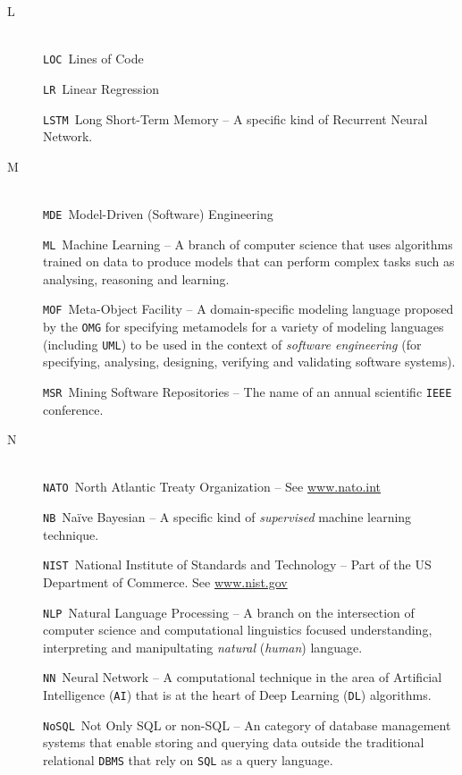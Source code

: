\begin{description}
\item[L]~\\
\verb|LOC|\quad~Lines of Code

\verb|LR|\quad~Linear Regression

\verb|LSTM|\quad~Long Short-Term Memory -- A specific kind of Recurrent Neural Network. %


\item[M]~\\

\verb|MDE|\quad~Model-Driven (Software) Engineering

\verb|ML|\quad~Machine Learning -- A branch of computer science that uses algorithms trained on data to produce models that can perform complex tasks such as analysing, reasoning and learning.

\verb|MOF|\quad~Meta-Object Facility -- A domain-specific modeling language proposed by the \verb|OMG| for specifying metamodels for a variety of modeling languages (including \verb|UML|) to be used in the context of \emph{software engineering} (\ie for specifying, analysing, designing, verifying and validating software systems).

\verb|MSR|\quad~Mining Software Repositories -- The name of an annual scientific \verb|IEEE| conference.


\item[N]~\\
\verb|NATO|\quad~North Atlantic Treaty Organization -- See \url{www.nato.int}

\verb|NB|\quad~Na\"ive Bayesian -- A specific kind of \emph{supervised} machine learning %
technique.

\verb|NIST|\quad~National Institute of Standards and Technology -- Part of the US Department of Commerce. See \url{www.nist.gov}

\verb|NLP|\quad~Natural Language Processing -- A branch on the intersection of computer science and computational linguistics focused understanding, interpreting and manipultating \emph{natural} (\ie \emph{human}) language.

\verb|NN|\quad~Neural Network -- A computational technique in the area of Artificial Intelligence (\verb|AI|) that is at the heart of Deep Learning (\verb|DL|) algorithms.

\verb|NoSQL|\quad~Not Only SQL or non-SQL -- An category of database management systems %
 that enable storing and querying data outside the traditional relational \verb|DBMS| that rely on \verb|SQL| as a query language.


\end{description}
